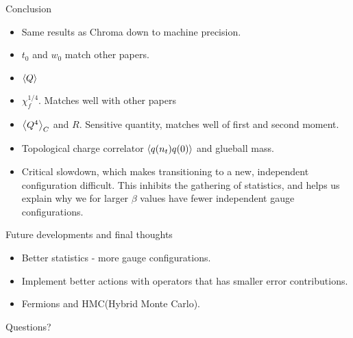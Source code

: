 \documentclass[10pt,show notes on second screen]{beamer}
\begin{document}
\begin{frame}{Conclusion}
{\begin{itemize}
    \item <2->Same results as Chroma down to machine precision.
    \item <3->$t_0$ and $w_0$ match other papers.
    \item <4->$\left\langle{Q}\right\rangle$
    \item <5->$\chi^{1/4}_f$. Matches well with other papers
    \item <6->$\left\langle{Q^4}\right\rangle_C$ and $R$. Sensitive quantity, matches well of first and second moment.
    \item <7->Topological charge correlator $\left\langle{q(n_t)q(0)}\right\rangle$ and glueball mass.
    \item <8->Critical slowdown, which makes transitioning to a new, independent configuration difficult. This inhibits the gathering of statistics, and helps us explain why we for larger $\beta$ values have fewer independent gauge configurations.
\end{itemize}
}
\end{frame}

\begin{frame}{Future developments and final thoughts}
\begin{itemize}[<+->]
    \item Better statistics - more gauge configurations.
    \item Implement better actions with operators that has smaller error contributions.
    \item Fermions and HMC(Hybrid Monte Carlo).
\end{itemize}
\end{frame}


\begin{frame}
\begin{center}
Questions?
\end{center}
\tiny

\end{frame}
\end{document}
